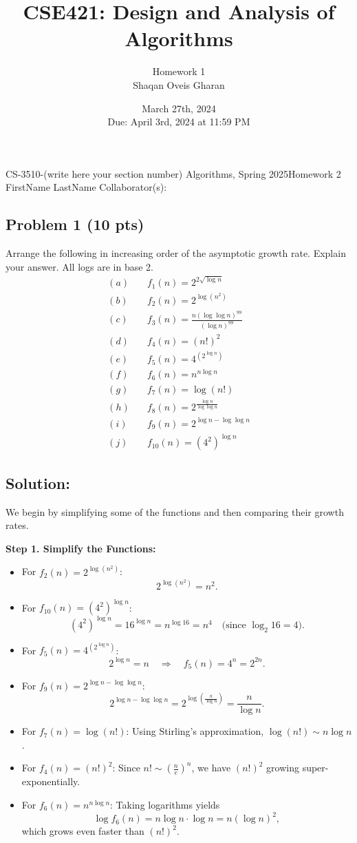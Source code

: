 \documentclass[12pt]{article}
\title{\textbf{CSE421: Design and Analysis of Algorithms}}
\author{Homework 1 \\ Shaqan Oveis Gharan}
\date{March 27th, 2024 \\ Due: April 3rd, 2024 at 11:59 PM}
\begin{document}
\noindent CS-3510-(write here your section number) Algorithms, Spring 2025\hfill Homework 2\\
FirstName LastName \hfill Collaborator(s):

\hrulefill

\subsection*{Problem 1 (10 pts)}
Arrange the following in increasing order of the asymptotic growth rate. Explain your answer. All logs are in base 2.
\begin{align*}
    (a) \quad & f_1(n) = 2^{2\sqrt{\log n}} \\
    (b) \quad & f_2(n) = 2^{\log(n^2)} \\
    (c) \quad & f_3(n) = \frac{n (\log \log n)^{99}}{(\log n)^{99}} \\
    (d) \quad & f_4(n) = (n!)^2\\
    (e) \quad & f_5(n) = 4^{(2^{\log n})} \\
    (f) \quad & f_6(n) = n^{n \log n} \\
    (g) \quad & f_7(n) = \log(n!) \\
    (h) \quad & f_8(n) = 2^{\frac{\log n}{\log \log n}} \\
    (i) \quad & f_9(n) = 2^{\log n - \log \log n} \\
    (j) \quad & f_{10}(n) = (4^2)^{\log n}
\end{align*}

\subsection*{Solution:}
We begin by simplifying some of the functions and then comparing their growth rates.

\bigskip
\noindent \textbf{Step 1. Simplify the Functions:}
\begin{itemize}
    \item For \(f_2(n)=2^{\log (n^2)}\):  
    \[
    2^{\log (n^2)} = n^2.
    \]
    \item For \(f_{10}(n)=(4^2)^{\log n}\):  
    \[
    (4^2)^{\log n} = 16^{\log n} = n^{\log 16} = n^4 \quad \text{(since \(\log_2 16 = 4\))}.
    \]
    \item For \(f_5(n)=4^{(2^{\log n})}\):  
    \[
    2^{\log n} = n \quad \Longrightarrow \quad f_5(n)=4^n = 2^{2n}.
    \]
    \item For \(f_9(n)=2^{\log n-\log \log n}\):  
    \[
    2^{\log n-\log \log n} = 2^{\log\left(\frac{n}{\log n}\right)} = \frac{n}{\log n}.
    \]
    \item For \(f_7(n)=\log(n!)\):  
    Using Stirling's approximation, \(\log(n!) \sim n\log n\).
    \item For \(f_4(n)=(n!)^2\):  
    Since \(n! \sim \left(\frac{n}{e}\right)^n\), we have \((n!)^2\) growing super-exponentially.
    \item For \(f_6(n)=n^{n \log n}\):  
    Taking logarithms yields
    \[
    \log f_6(n) = n \log n \cdot \log n = n(\log n)^2,
    \]
    which grows even faster than \((n!)^2\).
\end{itemize}
\end{document}
